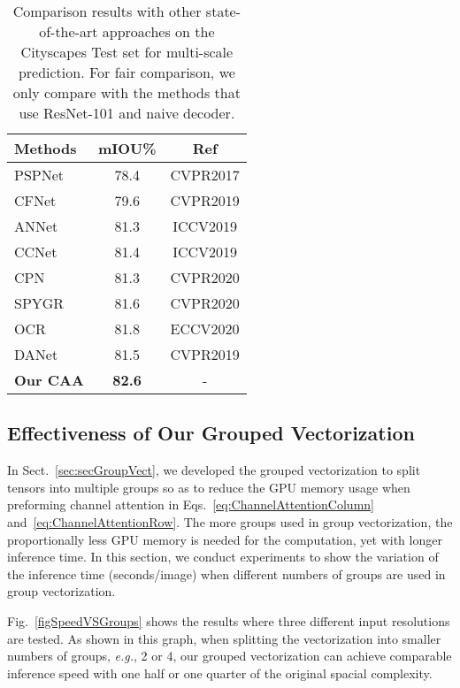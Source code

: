 \documentclass[journal]{IEEEtran}
\begin{document}
\begin{table}[t]
	\centering
\caption{Comparison results with other state-of-the-art approaches on the Cityscapes Test set for multi-scale prediction. For fair comparison, we only compare with the methods that use ResNet-101 and naive decoder.}
	\begin{tabular}{l|c|c}
		\toprule[1pt]
		\rule{0pt}{2ex} Methods & mIOU\% & Ref \\
		\midrule[0.5pt]
		\midrule[0.5pt]
		PSPNet~\cite{cPSPNet} & 78.4 & CVPR2017 \\
		CFNet~\cite{cCFNet} & 79.6 & CVPR2019 \\
		ANNet~\cite{cANNN} & 81.3 & ICCV2019 \\
		CCNet~\cite{cCCNet} & 81.4 & ICCV2019 \\
		CPN~\cite{cCPN} & 81.3 & CVPR2020 \\
		SPYGR~\cite{cSPYGR} & 81.6 & CVPR2020 \\
		OCR~\cite{cOCR} & 81.8 & ECCV2020 \\
		\midrule[0.5pt]
		DANet~\cite{cDualAttention} & 81.5 & CVPR2019\\
		\midrule[0.5pt]
		\textbf{Our CAA} & \textbf{82.6} & - \\
		\bottomrule[1pt]
	\end{tabular}
	
	\label{tabCityscapesSOTA}
\end{table}


\subsection{Effectiveness of Our Grouped Vectorization}

In Sect.~\ref{sec:secGroupVect}, we developed the grouped vectorization to split tensors into multiple groups so as to reduce the GPU memory usage when preforming channel attention in Eqs.~\eqref{eq:ChannelAttentionColumn} and~\eqref{eq:ChannelAttentionRow}. 
The more groups used in group vectorization, the proportionally less GPU memory is needed for the computation, yet with longer inference time.  
In this section, we conduct experiments to show the variation of the inference time (seconds/image) when different numbers of groups are used in group vectorization. 

Fig.~\ref{figSpeedVSGroups} shows the results where three different input resolutions are tested. 
As shown in this graph, when splitting the vectorization into smaller numbers of groups, \textit{e.g.}, 2 or 4, our grouped vectorization can achieve comparable inference speed with one half or one quarter of the original spacial complexity.
\end{document}
